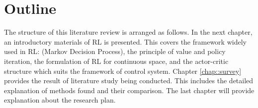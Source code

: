 \section{Outline}

The structure of this literature review is arranged as follows. In the next chapter, an introductory materials of \ac{RL} is presented. This covers the framework widely used in \ac{RL}: (Markov Decision Process), the principle of value and policy iteration, the formulation of \ac{RL} for continuous space, and the actor-critic structure which suits the framework of control system. Chapter \ref{chap::survey} provides the result of literature study being conducted. This includes the detailed explanation of methods found and their comparison. The last chapter will provide explanation about the research plan.  



